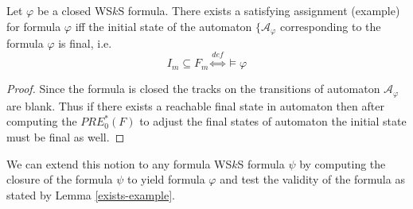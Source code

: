 \begin{lemma}\label{exists-example}
Let $\varphi$ be a closed WS$k$S formula. There exists a satisfying assignment
(example) for formula $\varphi$ iff the initial state of the automaton
$\{\mathcal{A}_\varphi$ corresponding to the formula $\varphi$ is final, i.e.
\begin{equation}
 I_m \subseteq F_m \overset{\mathit{def}}{\Leftrightarrow} \models \varphi
\end{equation}
\end{lemma}

\begin{proof}
 Since the formula is closed the tracks on the transitions of automaton
 $\mathcal{A}_\varphi$ are blank. Thus if there exists a reachable final state
 in automaton then after computing the $PRE_0^*(F)$ to adjust the final states
 of automaton the initial state must be final as well.
\end{proof}

We can extend this notion to any formula WS$k$S formula $\psi$ by computing the
closure of the formula $\psi$ to yield formula $\varphi$ and test the validity
of the formula as stated by Lemma \ref{exists-example}.

% 
% 

